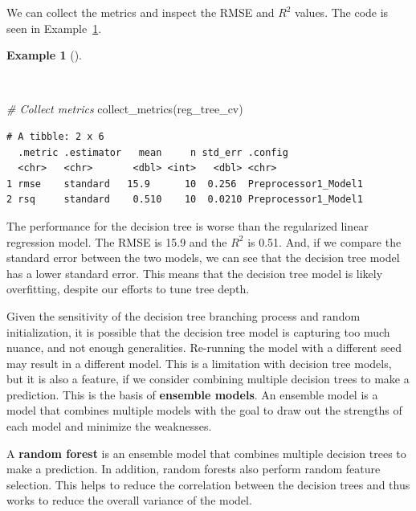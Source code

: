 \documentclass[
  letterpaper,
  krantz1]{latex/krantz-mod}
\newenvironment{Shaded}{\begin{snugshade}}{\end{snugshade}}
\newcommand{\CommentTok}[1]{\textcolor[rgb]{0.00,0.00,0.00}{\textit{#1}}}
\newcommand{\FunctionTok}[1]{\textcolor[rgb]{0.00,0.00,0.00}{#1}}
\newcommand{\NormalTok}[1]{\textcolor[rgb]{0.00,0.00,0.00}{#1}}
\theoremstyle{definition}
\theoremstyle{definition}
\newtheorem{example}{Example}[chapter]
\theoremstyle{remark}
\begin{document}
We can collect the metrics and inspect the
RMSE and \(R^2\)
values. The code is seen in Example~\ref{exm-predict-reg-metrics-tree}.

\begin{example}[]\protect\hypertarget{exm-predict-reg-metrics-tree}{}\label{exm-predict-reg-metrics-tree}

~

\begin{Shaded}
\begin{Highlighting}[numbers=left,,]
\CommentTok{\# Collect metrics}
\FunctionTok{collect\_metrics}\NormalTok{(reg\_tree\_cv)}
\end{Highlighting}
\end{Shaded}

\begin{verbatim}
# A tibble: 2 x 6
  .metric .estimator   mean     n std_err .config             
  <chr>   <chr>       <dbl> <int>   <dbl> <chr>               
1 rmse    standard   15.9      10  0.256  Preprocessor1_Model1
2 rsq     standard    0.510    10  0.0210 Preprocessor1_Model1
\end{verbatim}


\end{example}

The performance for the decision tree is worse than the regularized
linear regression model. The RMSE is 15.9 and the \(R^2\) is 0.51. And,
if we compare the standard error between the two models, we can see that
the decision tree model has a lower standard error. This means that the
decision tree model is likely overfitting, despite our efforts to tune
tree depth.

Given the sensitivity of the decision tree branching process and random
initialization, it is possible that the decision tree model is capturing
too much nuance, and not enough generalities. Re-running the model with
a different seed may result in a different model. This is a limitation
with decision tree models, but it is also a feature, if we consider
combining multiple decision trees to make a prediction. This is the
basis of \textbf{ensemble models}. An ensemble
model is a model that combines multiple models with the goal to draw out
the strengths of each model and minimize the weaknesses.

A \textbf{random forest} is an ensemble model that
combines multiple decision trees to make a prediction. In addition,
random forests also perform random feature selection. This helps to
reduce the correlation between the decision trees and thus works to
reduce the overall variance of the model.
\end{document}
